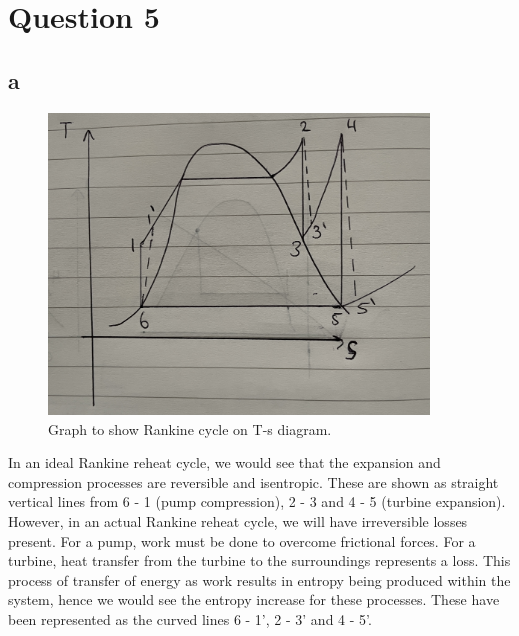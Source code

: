 \documentclass[11pt]{article}
\numberwithin{equation}{section}
\begin{document}
\section{Question 5}
\subsection{a}
\begin{figure}[H]
    \centering
    \includegraphics[height = 8cm]{./img/q5a.jpg}
    \caption{Graph to show Rankine cycle on T-s diagram.}
    \label{fig:q5a}
\end{figure}
In an ideal Rankine reheat cycle, we would see that the expansion and compression processes are reversible and isentropic. These are shown as straight vertical lines from 6 - 1 (pump compression), 2 - 3 and 4 - 5 (turbine expansion). However, in an actual Rankine reheat cycle, we will have irreversible losses present. For a pump, work must be done to overcome frictional forces. For a turbine, heat transfer from the turbine to the surroundings represents a loss. This process of transfer of energy as work results in entropy being produced within the system, hence we would see the entropy increase for these processes. These have been represented as the curved lines 6 - 1', 2 - 3' and 4 - 5'. 
\end{document}
